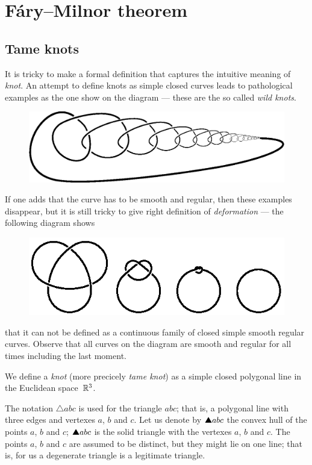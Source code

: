 \chapter{F\'ary--Milnor theorem}

\section{Tame knots}

It is tricky to make a formal definition that captures the intuitive meaning of \emph{knot}.
An attempt to define knots as simple closed curves leads to pathological examples as the one show on the diagram --- these are the so called \emph{wild knots}.
\begin{figure}[h]
\vskip-0mm
\centering
\includegraphics[scale=.6]{pics/Wild_knot}
\vskip0mm
\end{figure}
If one adds that the curve has to be smooth and regular,
then these examples disappear, but it is still tricky to give right definition of \emph{deformation} --- the following diagram shows 
\begin{figure}[h]
\vskip-0mm
\centering
\includegraphics[scale=1]{pics/knot}
\vskip0mm
\end{figure}
that it can not be defined as a continuous family of closed simple smooth regular curves. 
Observe that all curves on the diagram are smooth and regular for all times including the last moment.

We define a \emph{knot} (more precicely \emph{tame knot}) as a simple closed polygonal line in the Euclidean space~$\mathbb{R}^3$.

The notation $\triangle abc$ is used for the triangle $abc$; that is, a polygonal line with three edges and vertexes $a$, $b$ and $c$.
Let us denote by $\solidtriangle abc$ the convex hull of the points $a$, $b$ and $c$; $\solidtriangle abc$ is the solid triangle with the vertexes $a$, $b$ and $c$.
The points $a$, $b$ and $c$ are assumed to be distinct, but they might lie on one line;
that is, for us a degenerate triangle is a legitimate triangle.

